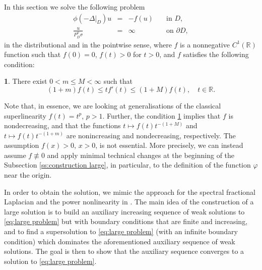 \documentclass[12pt,a4paper,onecolumn]{amsart}
\makeatletter
\theoremstyle{definition}
\newtheorem*{assumption*}{\assumptionnumber}
\providecommand{\assumptionnumber}{}
\newenvironment{assumption}[2]
{%
	\renewcommand{\assumptionnumber}{(\textbf{#1#2})}%
	\begin{assumption*}%
		\protected@edef\@currentlabel{(\textbf{#1#2})}%
	}
	{%
	\end{assumption*}
}
\newcommand{\R}{\mathbb{R}}
\newcommand{\1}{\mathbf 1}
\newcommand{\Lo}{\phi(-\left.\Delta\right\vert_{D})}
\newcommand{\PDfi}{P^\phi_{ D}}
\newcommand{\PDFI}{\PDfi}
\numberwithin{equation}{section}
\makeatother
\begin{document}
In this section we solve the following problem
\begin{equation}\label{eq:large problem}
	\begin{array}{rcll}
		\Lo u&=& - f(u)& \quad \text{in } D,\\
		\frac{u}{\PDFI\sigma}&=&\infty&\quad \text{on }\partial D,
	\end{array}
\end{equation}
in the distributional and in the pointwise sense, where $f$ is a nonnegative $C^{1}(\R)$ function such that $f(0)=0$, $f(t)>0$ for $t>0$, and $f$ satisfies the following condition:
\begin{assumption}{F}{}\label{F}
	There exist $0<m\le M<\infty$ such that
	$$ (1+m)f(t)\le tf'(t)\le (1+M)f(t),\quad t\in \R.$$
\end{assumption}
Note that, in essence, we are looking at generalisations of the classical superlinearity $f(t)=t^p$, $p>1$. Further, the condition \ref{F} implies that $f$ is nondecreasing, and that the functions $t\mapsto f(t)t^{-(1+M)}$ and $t\mapsto f(t)t^{-(1+m)}$ are  nonincreasing and nondecreasing, respectively. The assumption $f(x)>0$, $x>0$, is not essential. More precisely, we can instead assume $f\not\equiv 0$ and apply minimal technical changes at the beginning of the Subsection \ref{ss:construction large}, in particular, to the definition of the function $\varphi$ near the origin.

In order to obtain the solution, we mimic the approach for the spectral fractional Laplacian and the power nonlinearity in \cite{AbaDupaNonhomo2017}.
The main idea of the construction of a large solution is to build an auxiliary increasing sequence of weak solutions to \eqref{eq:large problem} but with boundary conditions that are finite and increasing, and to find a supersolution to \eqref{eq:large problem} (with an infinite boundary condition) which dominates the aforementioned auxiliary sequence of weak solutions. The goal is then to show that the auxiliary sequence converges to a solution to \eqref{eq:large problem}.
\end{document}
